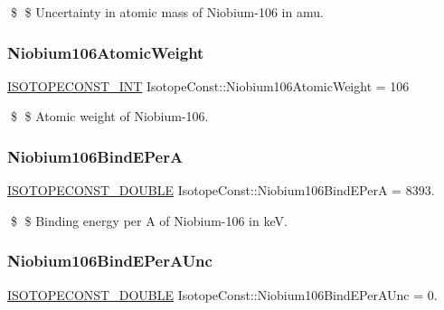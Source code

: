 \$ \$ Uncertainty in atomic mass of Niobium-\/106 in amu. \mbox{\label{group___isotope_const-_niobium-_nb106_gae95367b5ec0920eba3e2839c75cfc37c}} 
\subsubsection{\texorpdfstring{Niobium106\+Atomic\+Weight}{Niobium106AtomicWeight}}
{\footnotesize\ttfamily \mbox{\hyperlink{group___isotope_const-_macros_ga5f18360b3e99483a35c32d789e62621c}{I\+S\+O\+T\+O\+P\+E\+C\+O\+N\+S\+T\+\_\+\+I\+NT}} Isotope\+Const\+::\+Niobium106\+Atomic\+Weight = 106}

\$ \$ Atomic weight of Niobium-\/106. \mbox{\label{group___isotope_const-_niobium-_nb106_gae108677e2125ce97ed77d77679cbf5fb}} 
\subsubsection{\texorpdfstring{Niobium106\+Bind\+E\+PerA}{Niobium106BindEPerA}}
{\footnotesize\ttfamily \mbox{\hyperlink{group___isotope_const-_macros_ga8f45a7272ce02c0b4c65c44636ed719a}{I\+S\+O\+T\+O\+P\+E\+C\+O\+N\+S\+T\+\_\+\+D\+O\+U\+B\+LE}} Isotope\+Const\+::\+Niobium106\+Bind\+E\+PerA = 8393.}

\$ \$ Binding energy per A of Niobium-\/106 in keV. \mbox{\label{group___isotope_const-_niobium-_nb106_ga90bcae5afe32bbc5bd2e905fe4e2af87}} 
\subsubsection{\texorpdfstring{Niobium106\+Bind\+E\+Per\+A\+Unc}{Niobium106BindEPerAUnc}}
{\footnotesize\ttfamily \mbox{\hyperlink{group___isotope_const-_macros_ga8f45a7272ce02c0b4c65c44636ed719a}{I\+S\+O\+T\+O\+P\+E\+C\+O\+N\+S\+T\+\_\+\+D\+O\+U\+B\+LE}} Isotope\+Const\+::\+Niobium106\+Bind\+E\+Per\+A\+Unc = 0.}

